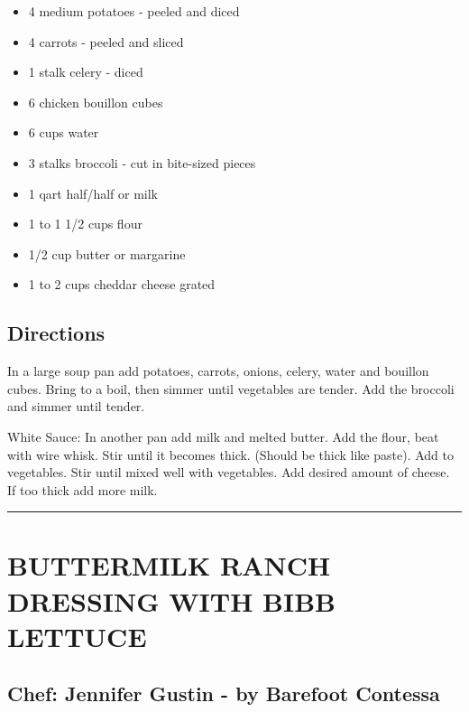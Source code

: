 \documentclass[
]{book}
\providecommand{\tightlist}{%
  \setlength{\itemsep}{0pt}\setlength{\parskip}{0pt}}
\begin{document}
\begin{itemize}
\tightlist
\item
  4 medium potatoes - peeled and diced
\item
  4 carrots - peeled and sliced
\item
  1 stalk celery - diced
\item
  6 chicken bouillon cubes
\item
  6 cups water
\item
  3 stalks broccoli - cut in bite-sized pieces
\item
  1 qart half/half or milk
\item
  1 to 1 1/2 cups flour
\item
  1/2 cup butter or margarine
\item
  1 to 2 cups cheddar cheese grated
\end{itemize}

\hypertarget{directions-15}{%
\subsection*{Directions}\label{directions-15}}


In a large soup pan add potatoes, carrots, onions, celery, water and bouillon cubes. Bring to a boil, then simmer until vegetables are tender. Add the broccoli and simmer until tender.

White Sauce:
In another pan add milk and melted butter. Add the flour, beat with wire whisk. Stir until it becomes thick. (Should be thick like paste). Add to vegetables. Stir until mixed well with vegetables. Add desired amount of cheese. If too thick add more milk.

\begin{center}\rule{0.5\linewidth}{0.5pt}\end{center}

\hypertarget{buttermilk-ranch-dressing-with-bibb-lettuce}{%
\section*{BUTTERMILK RANCH DRESSING WITH BIBB LETTUCE}\label{buttermilk-ranch-dressing-with-bibb-lettuce}}


\hypertarget{chef-jennifer-gustin---by-barefoot-contessa}{%
\subsection*{Chef: Jennifer Gustin - by Barefoot Contessa}\label{chef-jennifer-gustin---by-barefoot-contessa}}
\end{document}
